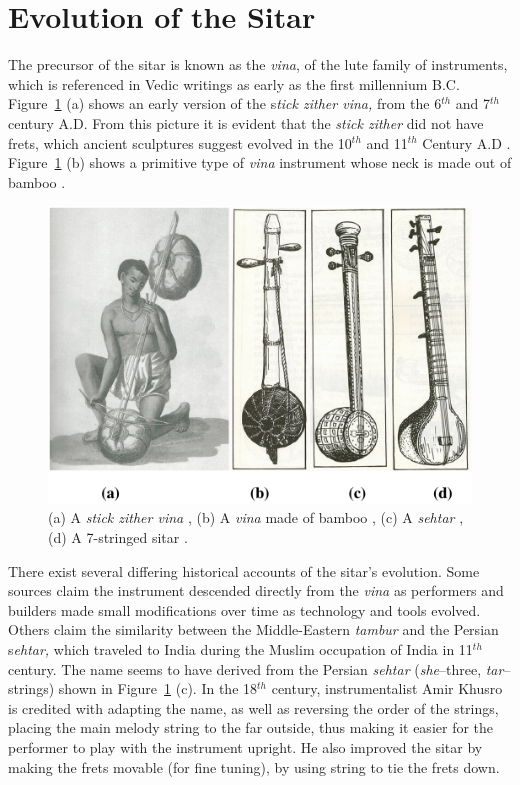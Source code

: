 \section{Evolution of the Sitar}

The precursor of the sitar is known as the \textit{vina}, of the lute family of instruments, which is referenced in Vedic writings as early as the first millennium B.C. Figure~\ref{Kapur:img-5} (a) shows an early version of the s\textit{tick zither vina,} from the 6$^{th}$ and 7$^{th}$ century A.D. From this picture it is evident that the \textit{stick zither }did not have frets, which ancient sculptures suggest evolved in the 10$^{th}$ and 11$^{th}$ Century A.D \cite{Bagchee:1998}. Figure~\ref{Kapur:img-5} (b) shows a primitive type of \textit{vina }instrument whose neck is made out of bamboo \cite{Sharma:1997}.


\begin{figure}[t]
\centering
\includegraphics[width=\textwidth]{img-5-eps-converted-to-crop.pdf}      
\caption{(a) A \emph{stick zither vina} \cite{Bagchee:1998}, (b) A \emph{vina} made of
bamboo \cite{Sharma:1997}, (c) A \emph{sehtar} \cite{Sharma:1997}, (d) A 7-stringed sitar \cite{Sharma:1997}.}
\label{Kapur:img-5}       %
\end{figure}


There exist several differing historical accounts of the sitar's evolution. Some sources claim the instrument descended directly from the \textit{vina} as performers and builders made small modifications over time as technology and tools evolved. Others claim the similarity between the Middle-Eastern \textit{tambur} and the Persian s\textit{ehtar,} which traveled to India during the Muslim occupation of India in 11$^{th}$ century. The name seems to have derived from the Persian \textit{sehtar} (\textit{she}--three, \textit{tar}--strings) shown in Figure~\ref{Kapur:img-5} (c). In the 18$^{th}$ century, instrumentalist Amir Khusro is credited with adapting the name, as well as reversing the order of the strings, placing the main melody string to the far outside, thus making it easier for the performer to play with the instrument upright. \cite{Bagchee:1998} He also improved the sitar by making the frets movable (for fine tuning), by using string to tie the frets down. \cite{Sharma:1997}

